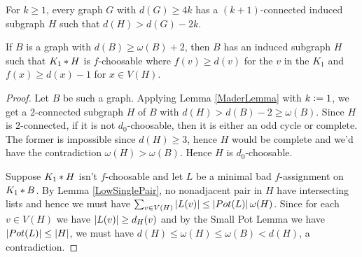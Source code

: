 \begin{lem}\label{MaderLemma}
For $k \geq 1$, every graph $G$ with $d(G) \geq 4k$ has a $(k+1)$-connected induced subgraph $H$ such that $d(H) > d(G) - 2k$.
\end{lem}

\begin{lem}\label{LowVertexHighAverageDegree}
If $B$ is a graph with $d(B) \geq \omega(B) + 2$, then $B$ has an induced subgraph $H$ such that $K_1 \mbox{\hspace{2 pt}$\ast$\hspace{2 pt}} H$ is $f$-choosable where $f(v) \geq d(v)$ for the $v$ in the $K_1$ and $f(x) \geq d(x) - 1$ for $x \in V(H)$.
\end{lem}
\begin{proof}
Let $B$ be such a graph.  Applying Lemma \ref{MaderLemma} with $k \mathrel{\mathop:}= 1$, we get a $2$-connected subgraph $H$ of $B$ with $d(H) > d(B) - 2 \geq \omega(B)$.  Since $H$ is $2$-connected, if it is not $d_0$-choosable, then it is either an odd cycle or complete.  The former is impossible since $d(H) \geq 3$, hence $H$ would be complete and we'd have the contradiction $\omega(H) > \omega(B)$.  Hence $H$ is $d_0$-choosable.  

Suppose $K_1 \mbox{\hspace{2 pt}$\ast$\hspace{2 pt}} H$ isn't $f$-choosable and let $L$ be a minimal bad $f$-assignment on $K_1 \mbox{\hspace{2 pt}$\ast$\hspace{2 pt}} B$.  
By Lemma \ref{LowSinglePair}, no nonadjacent pair in $H$ have intersecting lists and hence we must have $\sum_{v \in V(H)} \left|L(v)\right| \leq \left|Pot(L)\right|\omega(H)$.  Since for each $v \in V(H)$ we have $\left|L(v)\right| \geq d_H(v)$ and by the Small Pot Lemma we have $\left|Pot(L)\right| \leq \left|H\right|$, we must have $d(H) \leq \omega(H) \leq \omega(B) < d(H)$, a contradiction.
\end{proof}


